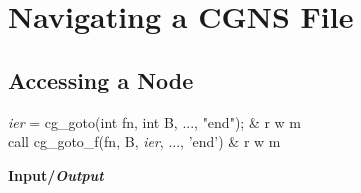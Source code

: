 \section{Navigating a CGNS File}
\label{s:navigating}
\thispagestyle{plain}

\subsection{Accessing a Node}
\label{s:goto}

\begin{fctbox}
\textcolor{output}{\textit{ier}} = cg\_goto(\textcolor{input}{int fn}, \textcolor{input}{int B}, ..., \textcolor{input}{"end"}); & r w m \\
\hline
call cg\_goto\_f(\textcolor{input}{fn}, \textcolor{input}{B}, \textcolor{output}{\textit{ier}}, ..., \textcolor{input}{'end'}) & r w m \\
\end{fctbox}

\noindent
\textbf{\textcolor{input}{Input}/\textcolor{output}{\textit{Output}}}

